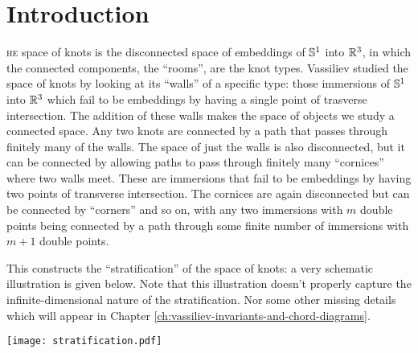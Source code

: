 \chapter*{Introduction}

\lettrine{}{he} space of knots is the disconnected space of embeddings of \(\S^{1}\) into \(\R^{3}\), in which the connected components, the ``rooms'', are the knot types. Vassiliev studied the space of knots by looking at its ``walls'' of a specific type: those immersions of \(\S^{1}\) into \(\R^{3}\) which fail to be embeddings by having a single point of trasverse intersection. The addition of these walls makes the space of objects we study a connected space. Any two knots are connected by a path that passes through finitely many of the walls. The space of just the walls is also disconnected, but it can be connected by allowing paths to pass through finitely many ``cornices'' where two walls meet. These are immersions that fail to be embeddings by having two points of transverse intersection. The cornices are again disconnected but can be connected by ``corners'' and so on, with any two immersions with \(m\) double points being connected by a path through some finite number of immersions with \(m + 1\) double points.

This constructs the ``stratification'' of the space of knots: a very schematic illustration is given below. Note that this illustration doesn't properly capture the infinite-dimensional nature of the stratification. Nor some other missing details which will appear in Chapter \ref{ch:vassiliev-invariants-and-chord-diagrams}.

\begin{center}
	\texttt{[image: stratification.pdf]}
\end{center}

